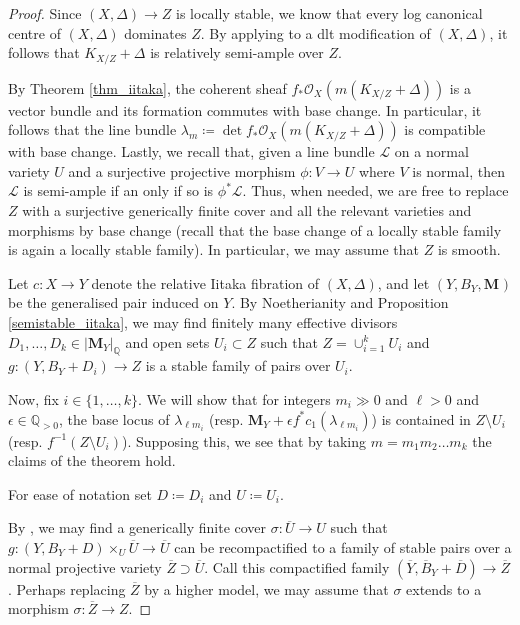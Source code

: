 \documentclass[12pt]{amsart}
\theoremstyle{plain}
\theoremstyle{definition}
\def\QQ{\mathbb Q}
\def\det{\operatorname{det}}
\def\rar{\rightarrow}
\def\bM#1.{\mathbf{M}_{#1}}
\def\K#1.{K_{#1}}
\def \QP {\mathbb Q_{>0}}
\begin{document}
\begin{proof}
Since $(X, \Delta) \rightarrow Z$ is locally stable, we know that every log canonical centre of $(X, \Delta)$ dominates
$Z$.
By applying \cite[Theorem 1.1]{HX11} to a dlt modification of $(X, \Delta)$, it follows
that $\K X/Z. + \Delta$ is relatively semi-ample over $Z$.

By Theorem \ref{thm_iitaka}, the coherent sheaf $f_* \mathcal{O}_X(m(\K X/Z. + \Delta))$ is a vector bundle and its formation commutes with base change.
In particular, it follows that the line bundle $\lambda_m\coloneqq \det f_* \mathcal{O}_X(m(\K X/Z. + \Delta))$ is compatible with base change.
Lastly, we recall that, given a line bundle $\mathcal{L}$ on a normal variety $U$ and a surjective projective morphism 
$\phi \colon V \rar U$ where $V$ is normal, then $\mathcal{L}$ is semi-ample if an only if so is $\phi^* \mathcal{L}$.
Thus, when needed, we are free to replace $Z$ with a surjective generically finite cover and all the relevant varieties and morphisms by base change (recall that the base change of a locally stable family is again a locally stable family).
In particular, we may assume that $Z$ is smooth.

Let $c \colon X \rar Y$ denote the relative Iitaka fibration of $(X,\Delta)$, and let $(Y,B_Y,\bM.)$ be the generalised pair induced on $Y$.
By Noetherianity and Proposition \ref{semistable_iitaka}, 
we may find finitely many effective divisors 
$D_1,\ldots,D_k \in |\bM Y.|_\QQ$ and open sets $U_i \subset Z$ such that 
$Z = \cup_{i= 1}^k U_i$ and $g \colon (Y,B_Y+D_i) \rar Z$ is a stable family of pairs over $U_i$.

Now, fix $i \in \{1, \dots, k\}$.
We will show that for integers $m_i \gg 0$ and $\ell>0$ and $\epsilon \in \QP$, 
the base locus of $\lambda_{\ell m_i}$ 
(resp. $\bM Y. +\epsilon f^*c_1(\lambda_{\ell m_i})$) is contained in $Z \setminus U_i$ 
(resp. $f^{-1}(Z \setminus U_i)$).
Supposing this, we see that by taking $m = m_1m_2\dots m_k$ the claims of the theorem hold.  


For ease of notation set $D\coloneqq D_i$ and $U \coloneqq U_i$.



By \cite[Corollary 6.18]{KP17}, we may find a generically finite cover $\sigma\colon \overline{U} \rightarrow U$ such that $g \colon (Y,B_Y+D)\times_U\overline{U} \rar \overline{U}$ can 
be recompactified to a family of stable pairs over a normal projective
variety $\overline{Z} \supset \overline{U}$.
Call this compactified family $(\overline{Y}, \overline{B}_Y+\overline{D}) \rightarrow \overline{Z}$.
Perhaps replacing $\overline{Z}$ by a higher model, we may assume that $\sigma$ extends to 
a morphism $\sigma\colon \overline{Z} \rightarrow Z$.



\end{proof}
\end{document}
